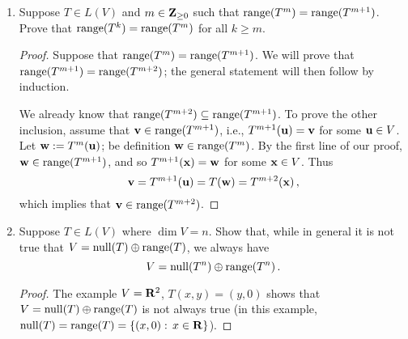 \documentclass[11pt]{amsart}
\begin{document}
\begin{enumerate}[(1)]
\begin{proof}
\begin{enumerate}
\item
Writing $T$ in terms of the standard basis,
\[
  T = \left( \begin{array}{ccc}
  0 & 1 & 0 \\
  0 & 0 & 1 \\
  0 & 0 & 0
  \end{array} \right) ,
\]
we see that $\dim \null(T^2) = 2$ and $\dim \null(T^3) = 3$, and so 0 is the only eigenvalue of $T$ and it has multiplicity 3, i.e., the corresponding generalized eigenspace is all of~$\C^3$.

\item
Suppose $S \in L(\C^3)$ is a square root of $T$, i.e., $S^2 = T$.
By part (a), $\dim \null (S^6) = \dim \null(T^3) = 3$, and so (by a proposition proved in class)
\[
  \dim \null(S^3) = \dim \null(S^4) = \dim \null(S^5) = \dim \null (S^6) = 3 \, .
\]
But this means that $\dim \null(T^2) = \dim \null(S^4) = 3$, contrary to what we showed in part~(a). \qedhere

\end{enumerate}
\end{proof}

\item Suppose $T \in L(V)$ and $m \in \mathbf{Z}_{ \ge 0 }$ such that $\operatorname{range}(T^m) = \operatorname{range}(T^{ m+1 })$. Prove that $\operatorname{range}(T^k) = \operatorname{range}(T^m)$ for all $k \ge m$. 

\begin{proof}
Suppose that $\operatorname{range}(T^m) = \operatorname{range}(T^{ m+1 })$. We will prove that $\operatorname{range}(T^{ m+1 }) = \operatorname{range}(T^{ m+2 })$; the general statement will then follow by induction.

We already know that $\operatorname{range}(T^{ m+2 }) \subseteq \operatorname{range}(T^{ m+1 })$.
To prove the other inclusion, assume that $\mathbf v \in \operatorname{range}(T^{ m+1 })$, i.e., $T^{ m+1 } (\mathbf u) = \mathbf v$ for some $\mathbf u \in V$.
Let $\mathbf w := T^m(\mathbf u)$; be definition $\mathbf w \in \operatorname{range}(T^m)$.
By the first line of our proof, $\mathbf w \in \operatorname{range}(T^{ m+1 })$, and so $T^{ m+1 } (\mathbf x) = \mathbf w$ for some $\mathbf x \in V$.
Thus
\[
  \mathbf v = T^{ m+1 } (\mathbf u) = T(\mathbf w) = T^{ m+2 } (\mathbf x) \, ,
\]
which implies that $\mathbf v \in \operatorname{range}(T^{ m+2 })$.
\end{proof}

\item Suppose $T \in L(V)$ where $\dim V = n$. Show that, while in general it is not true that $V = \operatorname{null}(T) \oplus \operatorname{range}(T)$, we always have
\[
  V = \operatorname{null}(T^n) \oplus \operatorname{range}(T^n) \, .
\]

\begin{proof}
The example $V = \mathbf{R}^2$, $T(x,y) = (y,0)$ shows that $V = \operatorname{null}(T) \oplus \operatorname{range}(T)$ is not always true (in this example, $\operatorname{null}(T) = \operatorname{range}(T) = \left\{ (x,0) : \, x \in \mathbf{R} \right\}$).


\end{proof}
\end{enumerate}
\end{document}

